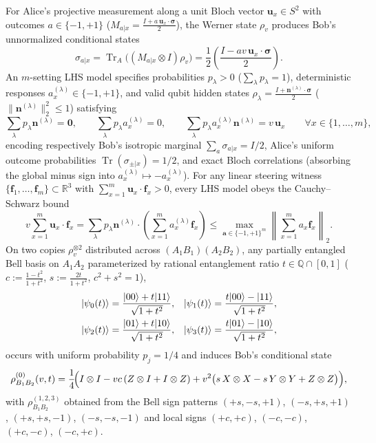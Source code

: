 \documentclass[11pt,a4paper]{article}
\theoremstyle{definition}
\theoremstyle{remark}
\newcommand{\QQ}{\mathbb{Q}}
\newcommand{\RR}{\mathbb{R}}
\newcommand{\Tr}{\operatorname{Tr}}
\begin{document}
For Alice's projective measurement along a unit Bloch vector $\mathbf{u}_x \in S^2$ with outcomes $a \in \{-1, +1\}$ ($M_{a|x} = \frac{I + a\,\mathbf{u}_x\cdot\boldsymbol{\sigma}}{2}$), the Werner state $\rho_v$ produces Bob's unnormalized conditional states
\begin{equation}
  \sigma_{a|x} = \Tr_A\bigl((M_{a|x} \otimes I)\rho_v\bigr) = \frac{1}{2}\!\left(\frac{I - a v\,\mathbf{u}_x \cdot \boldsymbol{\sigma}}{2}\right).
\end{equation}
An $m$-setting LHS model specifies probabilities $p_\lambda > 0$ ($\sum_\lambda p_\lambda = 1$), deterministic responses $a_x^{(\lambda)} \in \{-1, +1\}$, and valid qubit hidden states $\rho_\lambda = \frac{I + \mathbf{n}^{(\lambda)}\cdot\boldsymbol{\sigma}}{2}$ ($\|\mathbf{n}^{(\lambda)}\|_2^2 \le 1$) satisfying
\begin{equation}\label{eq:lhs-def}
  \sum_{\lambda} p_\lambda \mathbf{n}^{(\lambda)} = \mathbf{0}, \qquad
  \sum_{\lambda} p_\lambda a_x^{(\lambda)} = 0, \qquad
  \sum_{\lambda} p_\lambda a_x^{(\lambda)} \mathbf{n}^{(\lambda)} = v\,\mathbf{u}_x \qquad \forall x \in \{1,\dots,m\},
\end{equation}
encoding respectively Bob's isotropic marginal $\sum_a \sigma_{a|x} = I/2$, Alice's uniform outcome probabilities $\Tr(\sigma_{\pm|x}) = 1/2$, and exact Bloch correlations (absorbing the global minus sign into $a_x^{(\lambda)} \mapsto -a_x^{(\lambda)}$). For any linear steering witness $\{\mathbf{f}_1,\dots,\mathbf{f}_m\} \subset \RR^3$ with $\sum_{x=1}^m \mathbf{u}_x \cdot \mathbf{f}_x > 0$, every LHS model obeys the Cauchy--Schwarz bound
\begin{equation}\label{eq:witness-duality}
  v \sum_{x=1}^m \mathbf{u}_x \cdot \mathbf{f}_x
  = \sum_{\lambda} p_\lambda \mathbf{n}^{(\lambda)} \cdot \left(\sum_{x=1}^m a_x^{(\lambda)} \mathbf{f}_x\right)
  \le \max_{\mathbf{a} \in \{-1,+1\}^m} \left\|\sum_{x=1}^m a_x \mathbf{f}_x\right\|_2.
\end{equation}
On two copies $\rho_v^{\otimes 2}$ distributed across $(A_1 B_1)(A_2 B_2)$, any partially entangled Bell basis on $A_1 A_2$ parameterized by rational entanglement ratio $t \in \QQ \cap [0, 1]$ ($c := \frac{1-t^2}{1+t^2}$, $s := \frac{2t}{1+t^2}$, $c^2 + s^2 = 1$),
\begin{align}\label{eq:partial-bell}
  |\psi_0(t)\rangle &= \frac{|00\rangle + t|11\rangle}{\sqrt{1+t^2}}, &
  |\psi_1(t)\rangle &= \frac{t|00\rangle - |11\rangle}{\sqrt{1+t^2}}, \notag\\
  |\psi_2(t)\rangle &= \frac{|01\rangle + t|10\rangle}{\sqrt{1+t^2}}, &
  |\psi_3(t)\rangle &= \frac{t|01\rangle - |10\rangle}{\sqrt{1+t^2}},
\end{align}
occurs with uniform probability $p_j = 1/4$ and induces Bob's conditional state
\begin{equation}\label{eq:cond-state}
  \rho_{B_1 B_2}^{(0)}(v,t)
  = \frac{1}{4}\!\Bigl(I\otimes I - v c\,(Z\otimes I + I\otimes Z) + v^2\bigl(s\,X\otimes X - s\,Y\otimes Y + Z\otimes Z\bigr)\Bigr),
\end{equation}
with $\rho_{B_1 B_2}^{(1,2,3)}$ obtained from the Bell sign patterns $(+s,-s,+1)$, $(-s,+s,+1)$, $(+s,+s,-1)$, $(-s,-s,-1)$ and local signs $(+c,+c)$, $(-c,-c)$, $(+c,-c)$, $(-c,+c)$.
\end{document}
